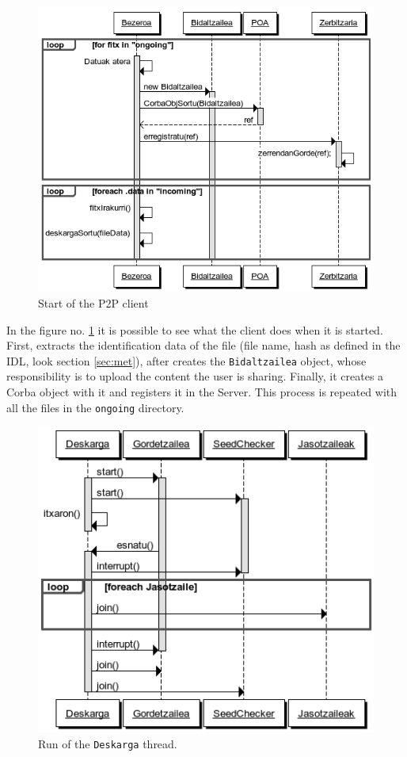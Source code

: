 \begin{figure}
   \centering
   \includegraphics[scale=0.6]{irudiak/bezeroahasiera.png}
   \caption{Start of the P2P client}
   \label{fig:hasiera}
\end{figure} 

In the figure no. \ref{fig:hasiera} it is possible to see what the client does when it is started.  First, extracts the identification data of the file (file name, hash as defined in the IDL, look section \ref{sec:met}), after creates  the \texttt{Bidaltzailea} object, whose responsibility is to upload the content the user is sharing. Finally, it creates a Corba object with it and registers it in the Server. This process is repeated with all the files in the \texttt{ongoing} directory. 

\begin{figure}
   \centering
   \includegraphics[scale=0.6]{irudiak/deskargenruna.png}
   \caption{Run of the \texttt{Deskarga} thread.}
   \label{fig:deskarga}
\end{figure} 

